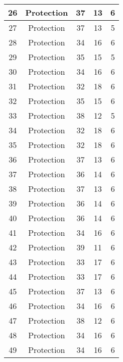 \documentclass[results.tex]{subfiles}
\begin{document}
\begin{center}
\begin{tabular}{| c || c | c | c | c |}
    \hline
    26 & Protection & 37 & 13 & 6 \\ 
    \hline
    27 & Protection & 37 & 13 & 5 \\ 
    \hline
    28 & Protection & 34 & 16 & 6 \\ 
    \hline
    29 & Protection & 35 & 15 & 5 \\ 
    \hline
    30 & Protection & 34 & 16 & 6 \\ 
    \hline
    31 & Protection & 32 & 18 & 6 \\ 
    \hline
    32 & Protection & 35 & 15 & 6 \\ 
    \hline
    33 & Protection & 38 & 12 & 5 \\ 
    \hline
    34 & Protection & 32 & 18 & 6 \\ 
    \hline
    35 & Protection & 32 & 18 & 6 \\ 
    \hline
    36 & Protection & 37 & 13 & 6 \\ 
    \hline
    37 & Protection & 36 & 14 & 6 \\ 
    \hline
    38 & Protection & 37 & 13 & 6 \\ 
    \hline
    39 & Protection & 36 & 14 & 6 \\ 
    \hline
    40 & Protection & 36 & 14 & 6 \\ 
    \hline
    41 & Protection & 34 & 16 & 6 \\ 
    \hline
    42 & Protection & 39 & 11 & 6 \\ 
    \hline
    43 & Protection & 33 & 17 & 6 \\ 
    \hline
    44 & Protection & 33 & 17 & 6 \\ 
    \hline
    45 & Protection & 37 & 13 & 6 \\ 
    \hline
    46 & Protection & 34 & 16 & 6 \\ 
    \hline
    47 & Protection & 38 & 12 & 6 \\ 
    \hline
    48 & Protection & 34 & 16 & 6 \\ 
    \hline
    49 & Protection & 34 & 16 & 6 \\ 
    \hline   \end{tabular}
\end{center}
\end{document}
